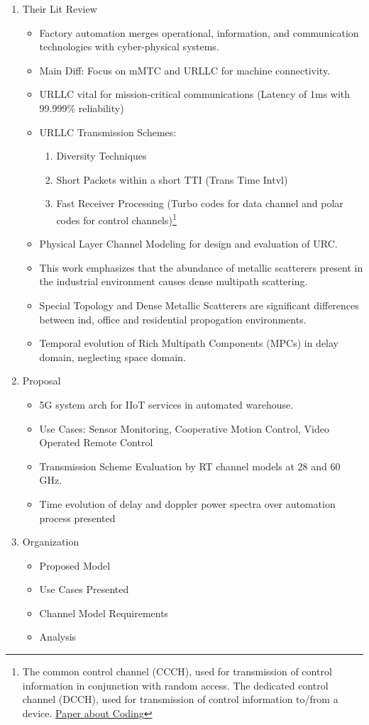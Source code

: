 \documentclass[11pt]{article}
\begin{document}
\begin{enumerate}
\item Their Lit Review
\label{sec:orgce2059a}
\begin{itemize}
\item Factory automation merges operational, information, and communication technologies with cyber-physical systems.
\item Main Diff: Focus on mMTC and URLLC for machine connectivity.
\item URLLC vital for mission-critical communications (Latency of 1ms with 99.999\% reliability)
\item URLLC Transmission Schemes:
\begin{enumerate}
\item Diversity Techniques
\item Short Packets within a short TTI (Trans Time Intvl)
\item Fast Receiver Processing (Turbo codes for data channel and polar codes for control channels)\footnote{The common control channel (CCCH), used for transmission of control information in conjunction with random access. The dedicated control channel (DCCH), used for transmission of control information to/from a device. \href{https://klevas.mif.vu.lt/\~skersys/vsd/turbo/0429hage.pdf}{Paper about Coding}}
\end{enumerate}
\item Physical Layer Channel Modeling for design and evaluation of URC.
\item This work emphasizes that the abundance of metallic scatterers present in the industrial environment causes dense multipath scattering.
\item Special Topology and Dense Metallic Scatterers are significant differences between ind, office and residential propogation environments.
\item Temporal evolution of Rich Multipath Components (MPCs) in delay domain, neglecting space domain.
\end{itemize}
\item Proposal
\label{sec:orgbb35a36}
\begin{itemize}
\item 5G system arch for IIoT services in automated warehouse.
\item Use Cases: Sensor Monitoring, Cooperative Motion Control, Video Operated Remote Control
\item Transmission Scheme Evaluation by RT channel models at 28 and 60 GHz.
\item Time evolution of delay and doppler power spectra over automation process presented
\end{itemize}
\item Organization
\label{sec:orgf96f23e}
\begin{itemize}
\item Proposed Model
\item Use Cases Presented
\item Channel Model Requirements
\item Analysis
\end{itemize}
\end{enumerate}
\end{document}
